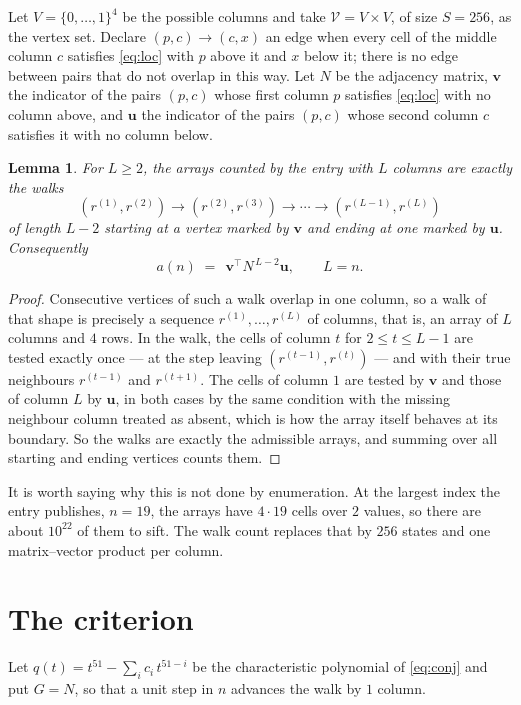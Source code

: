 \documentclass[11pt,a4paper]{article}
\theoremstyle{plain}
\newtheorem{lemma}[theorem]{Lemma}
\theoremstyle{definition}
\begin{document}
Let $V=\{0,\dots,1\}^{4}$ be the possible columns and take
$\mathcal V=V\times V$, of size $S=256$, as the vertex set. Declare $(p,c)\to(c,x)$ an edge
when every cell of the middle column $c$ satisfies \eqref{eq:loc} with $p$ above it and $x$
below it; there is no edge between pairs that do not overlap in this way. Let $N$ be the
adjacency matrix, $\mathbf{v}$ the indicator of the pairs $(p,c)$ whose first column $p$
satisfies \eqref{eq:loc} with no column above, and $\mathbf{u}$ the indicator of
the pairs $(p,c)$ whose second column $c$ satisfies it with no column below.

\begin{lemma}\label{lem:walk}
For $L\ge2$, the arrays counted by the entry with $L$ columns are exactly the walks
\[
(r^{(1)},r^{(2)})\to(r^{(2)},r^{(3)})\to\cdots\to(r^{(L-1)},r^{(L)})
\]
of length $L-2$ starting at a vertex marked by $\mathbf{v}$ and ending at one marked by
$\mathbf{u}$. Consequently
\[
a(n)\;=\;\,\mathbf{v}^{\!\top}N^{\,L-2}\mathbf{u},\qquad L=n .
\]
\end{lemma}

\begin{proof}
Consecutive vertices of such a walk overlap in one column, so a walk of that shape is
precisely a sequence $r^{(1)},\dots,r^{(L)}$ of columns, that is, an array of $L$ columns
and $4$ rows. In the walk, the cells of column $t$ for $2\le t\le L-1$ are tested
exactly once --- at the step leaving $(r^{(t-1)},r^{(t)})$ --- and with their true
neighbours $r^{(t-1)}$ and $r^{(t+1)}$. The cells of column $1$ are tested by
$\mathbf{v}$ and those of column $L$ by $\mathbf{u}$, in both cases by the same condition
with the missing neighbour column treated as absent, which is how the array itself behaves at
its boundary. So the walks are exactly the admissible arrays, and summing over all starting
and ending vertices counts them.
\end{proof}


It is worth saying why this is not done by enumeration. At the largest index the entry
publishes, $n=19$, the arrays have $4\cdot19$ cells over
$2$ values, so there are about $10^{22}$ of them to sift. The
walk count replaces that by $256$ states and one matrix--vector product per column.
\section{The criterion}

Let $q(t)=t^{51}-\sum_i c_i\,t^{51-i}$ be the characteristic polynomial of
\eqref{eq:conj} and put $G=N$, so that a unit step in $n$ advances the walk by
$1$ column.
\end{document}
